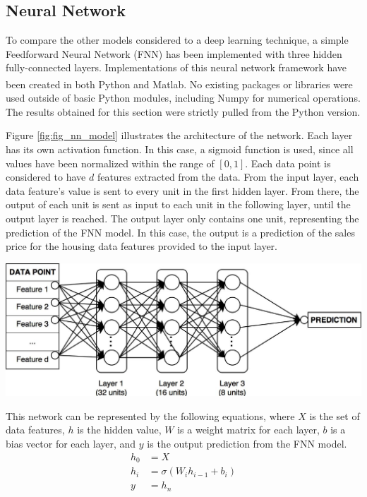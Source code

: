 \documentclass[10pt]{article}
\begin{document}
\begin{multicols}{2}
		\subsection{Neural Network}

		To compare the other models considered to a deep learning technique, a simple Feedforward Neural Network (FNN) has been implemented with three hidden fully-connected layers. Implementations of this neural network framework have been created in both Python and Matlab\textsuperscript{\cite{git_repo}}. No existing packages or libraries were used outside of basic Python modules, including Numpy for numerical operations. The results obtained for this section were strictly pulled from the Python version.
		
		Figure \ref{fig:fig_nn_model} illustrates the architecture of the network. Each layer has its own activation function. In this case, a sigmoid function is used, since all values have been normalized within the range of \([0, 1]\). Each data point is considered to have \(d\) features extracted from the data. From the input layer, each data feature's value is sent to every unit in the first hidden layer. From there, the output of each unit is sent as input to each unit in the following layer, until the output layer is reached. The output layer only contains one unit, representing the prediction of the FNN model. In this case, the output is a prediction of the sales price for the housing data features provided to the input layer.
		
		\begin{center}
            \captionsetup{type=figure}
			\includegraphics[scale=0.15]{NeuralNet/fig_nn_01} \\
			\label{fig:fig_nn_model}
		\end{center}
	
		This network can be represented by the following equations, where \(X\) is the set of data features, \(h\) is the hidden value, \(W\) is a weight matrix for each layer, \(b\) is a bias vector for each layer, and \(y\) is the output prediction from the FNN model.
		\begin{align}
			h_{0} &= X \nonumber \\
			h_{i} &= \sigma(W_{i}h_{i-1} + b_{i}) \nonumber \\
			y &= h_{n} \nonumber
		\end{align}
	

\end{multicols}
\end{document}
